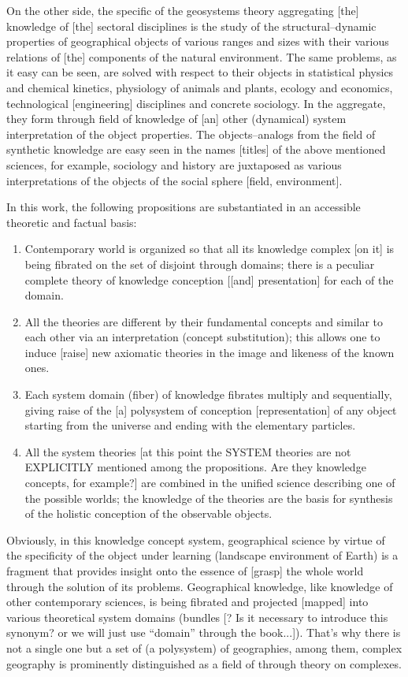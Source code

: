 \documentclass[12pt,leqno]{book}
\begin{document}
On the other side, the specific of the geosystems theory aggregating [the] knowledge of [the] sectoral disciplines is the study of the structural--dynamic properties of geographical objects of various ranges and sizes with their various relations of [the] components of the natural environment. The same problems, as it easy can be seen, are solved with respect to their objects in statistical physics and chemical kinetics, physiology of animals and plants, ecology and economics, technological [engineering] disciplines and concrete sociology. In the aggregate, they form through field of knowledge of [an] other (dynamical) system interpretation of the object properties. The objects--analogs from the field of synthetic knowledge are easy seen in the names [titles] of the above mentioned sciences, for example, sociology and history are juxtaposed as various interpretations of the objects of the social sphere [field, environment].

In this work, the following propositions are substantiated in an accessible theoretic and factual basis:
\begin{enumerate}\bf
\item{} Contemporary world is organized so that all its knowledge complex [on it] is being fibrated on the set of disjoint through domains; there is a peculiar complete theory of knowledge conception [[and] presentation] for each of the domain.
\item{} All the theories are different by their fundamental concepts and similar to each other via an interpretation (concept substitution); this allows one to induce [raise] new axiomatic theories in the image and likeness of the known ones.
\item{} Each system domain (fiber) of knowledge fibrates multiply and sequentially, giving raise of the [a] polysystem of conception [representation] of any object starting from the universe and ending with the elementary particles.
\item{} All the system theories [at this point the SYSTEM theories are not EXPLICITLY mentioned among the propositions. Are they knowledge concepts, for example?] are combined in the unified science describing one of the possible worlds; the knowledge of the theories are the basis for synthesis of the holistic conception of the observable objects.
\end{enumerate}

Obviously, in this knowledge concept system, geographical science by virtue of the specificity of the object under learning (landscape environment of Earth) is a fragment that provides insight onto the essence of [grasp] the whole world through the solution of its problems. Geographical knowledge, like knowledge of other contemporary sciences, is being fibrated and projected [mapped] into various theoretical system domains (bundles [? Is it necessary to introduce this synonym? or we will just use ``domain'' through the book...]). That's why there is not a single one but a set of (a polysystem) of geographies, among them, complex geography is prominently distinguished as a field of through theory on complexes.
\end{document}
